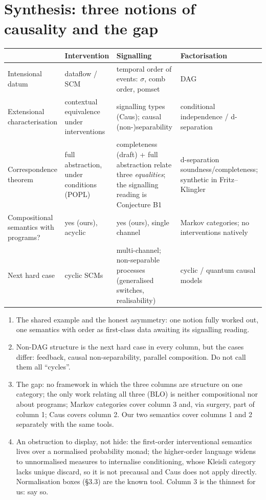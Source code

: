 \documentclass[11pt,a4paper]{article}
\newif\ifskeletonnotes
\newcommand{\budget}[1]{\ifskeletonnotes{\small\color{red!60!black}\textbf{(\textasciitilde#1 words)}}\fi}
\begin{document}
\section{Synthesis: three notions of causality and the gap}\budget{350}
\begin{center}\small
\begin{tabularx}{\textwidth}{lXXX}
\toprule
 & Intervention & Signalling & Factorisation\\
\midrule
Intensional datum & dataflow / SCM & temporal order of events: $\sigma$, comb order, pomset & DAG\\
Extensional characterisation & contextual equivalence under interventions & signalling types (Caus); causal (non-)separability & conditional independence / d-separation\\
Correspondence theorem & full abstraction, under conditions (POPL) & completeness (draft) + full abstraction relate three \emph{equalities}; the signalling reading is Conjecture B1 & d-separation soundness/completeness; synthetic in Fritz--Klingler\\
Compositional semantics with programs? & yes (ours), acyclic & yes (ours), single channel & Markov categories; no interventions natively\\
Next hard case & cyclic SCMs & multi-channel; non-separable processes (generalised switches, realisability) & cyclic / quantum causal models\\
\bottomrule
\end{tabularx}
\end{center}
\begin{enumerate}[nosep]
\item The shared example and the honest asymmetry: one notion fully worked out, one semantics with order as first-class data awaiting its signalling reading.
\item Non-DAG structure is the next hard case in every column, but the cases differ: feedback, causal non-separability, parallel composition. Do not call them all ``cycles''.
\item The gap: no framework in which the three columns are structure on one category; the only work relating all three (BLO) is neither compositional nor about programs; Markov categories cover column 3 and, via surgery, part of column 1; Caus covers column 2. Our two semantics cover columns 1 and 2 separately with the same tools.
\item An obstruction to display, not hide: the first-order interventional semantics lives over a normalised probability monad; the higher-order language widens to unnormalised measures to internalise conditioning, whose Kleisli category lacks unique discard, so it is not precausal and Caus does not apply directly. Normalisation boxes (\S3.3) are the known tool. Column 3 is the thinnest for us: say so.
\end{enumerate}
\end{document}
